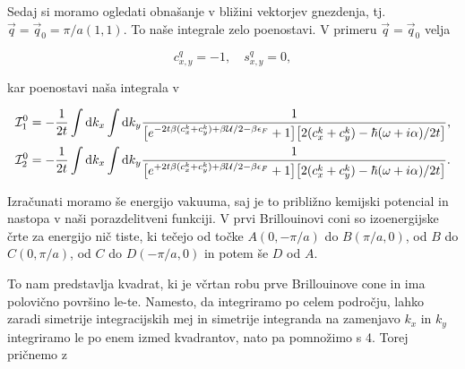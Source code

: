 \documentclass[a4paper, 12pt]{article}
\newcommand{\vq}{
	\ensuremath{\vec{q}}
}
\newcommand{\w}{
	\ensuremath{\omega}
}
\newcommand{\e}{
	\ensuremath{\epsilon}
}
\renewcommand{\ni}{
	\noindent
}
\newcommand{\dd}{
	\ensuremath{\text{d}}
}
\newcommand{\I}{
	\ensuremath{\mathcal{I}}
}
\begin{document}
Sedaj si moramo ogledati obna\v sanje v bli\v zini vektorjev gnezdenja, tj. $\vq = \vq_0 =
\pi/a (1,1)$. To na\v se integrale zelo poenostavi. V primeru $\vq = \vq_0$ velja

\begin{equation}
	c_{x,y}^q = -1, \quad s_{x,y}^q = 0,
\end{equation}

\ni kar poenostavi na\v sa integrala v

\begin{align}
	\I_1^0 &= -\frac{1}{2t}\int \dd k_x\int \dd k_y \frac{1}
		{\big[e^{-2t\beta(c_x^k + c_y^k) + \beta\mathcal{U}/2 - \beta\e_F} + 1\big]\big[
		2(c_x^k + c_y^k) - \hbar(\w + i\alpha)/2t\big]}, \notag \\
	\I_2^0 &= -\frac{1}{2t}\int \dd k_x\int \dd k_y \frac{1}
	{\big[e^{+2t\beta(c_x^k + c_y^k) + \beta\mathcal{U}/2 - \beta\e_F} + 1\big]\big[
		2(c_x^k + c_y^k) - \hbar(\w + i\alpha)/2t\big]}.
\end{align}

\ni Izra\v cunati moramo \v se energijo vakuuma, saj je to pribli\v zno kemijski potencial in nastopa v na\v si
porazdelitveni funkciji. V prvi Brillouinovi coni so izoenergijske \v crte za energijo ni\v c tiste, ki te\v cejo od
to\v cke $A (0, -\pi/a)$ do $B (\pi/a, 0)$, od $B$ do $C (0, \pi/a)$, od $C$ do $D (-\pi/a, 0)$ in potem \v se $D$ od $A$.

To nam predstavlja kvadrat, ki je v\v crtan robu prve Brillouinove cone in ima polovi\v cno povr\v sino le-te.
Namesto, da integriramo po celem podro\v cju, lahko zaradi simetrije integracijskih mej in simetrije integranda na
zamenjavo $k_x$ in $k_y$ integriramo le po enem izmed kvadrantov, nato pa pomno\v zimo s 4. Torej pri\v cnemo z
\end{document}
